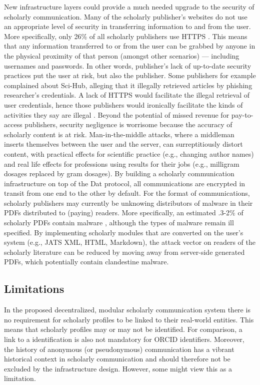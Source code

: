 \documentclass[publications,article,submit,moreauthors,pdftex,10pt,a4paper]{Definitions/mdpi}
\begin{document}
New infrastructure layers could provide a much needed upgrade to the
security of scholarly communication. Many of the scholarly publisher's
websites do not use an appropriate level of security in transferring
information to and from the user. More specifically, only 26\% of all
scholarly publishers use HTTPS \citep{https-hartgerink}. This means
that any information transferred to or from the user can be grabbed by
anyone in the physical proximity of that person (amongst other
scenarios) --- including usernames and passwords. In other words,
publisher's lack of up-to-date security practices put the user at
risk, but also the publisher. Some publishers for example complained
about Sci-Hub, alleging that it illegally retrieved articles by
phishing researcher's credentials. A lack of HTTPS would facilitate
the illegal retrieval of user credentials, hence those publishers
would ironically facilitate the kinds of activities they say are
illegal \citep{doi:10.1126/science.aaf5664}. Beyond the potential of
missed revenue for pay-to-access publishers, security negligence is
worrisome because the accuracy of scholarly content is at
risk. Man-in-the-middle attacks, where a middleman inserts themselves
between the user and the server, can surreptitiously distort content,
with practical effects for scientific practice (e.g., changing author
names) and real life effects for professions using results for their
jobs (e.g., milligram dosages replaced by gram dosages). By building a
scholarly communication infrastructure on top of the Dat protocol, all
communications are encrypted in transit from one end to the other by
default. For the format of communications, scholarly publishers may
currently be unknowing distributors of malware in their PDFs
distributed to (paying) readers. More specifically, an estimated
.3-2\% of scholarly PDFs contain malware
\citep{doi:10.3233/978-1-61499-744-3-107}, although the types of
malware remain ill specified. By implementing scholarly modules that
are converted on the user's system (e.g., JATS XML, HTML, Markdown),
the attack vector on readers of the scholarly literature can be
reduced by moving away from server-side generated PDFs, which
potentially contain clandestine malware.

\subsection{Limitations}

In the proposed decentralized, modular scholarly communication system
there is no requirement for scholarly profiles to be linked to their
real-world entities. This means that scholarly profiles may or may not
be identified. For comparison, a link to a identification is also not
mandatory for ORCID identifiers. Moreover, the history of anonymous
(or pseudonymous) communication has a vibrant historical context in
scholarly communication \citep[e.g.,][]{doi:10.1093/biomet/6.1.1} and
should therefore not be excluded by the infrastructure
design. However, some might view this as a limitation.
\end{document}
